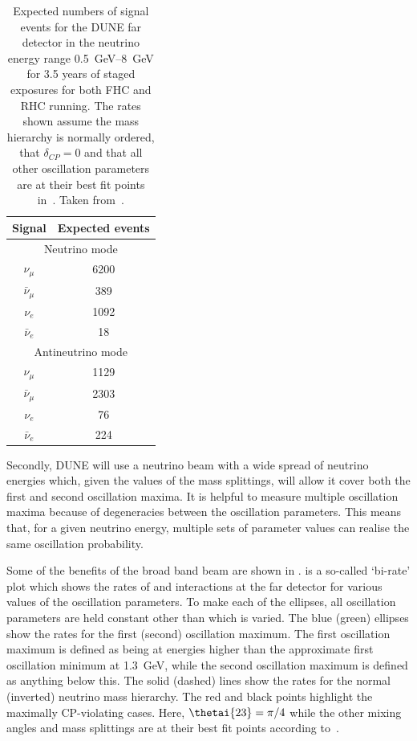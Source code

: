 \begin{table}
  \caption[Expected numbers of DUNE far detector events.]{Expected numbers of signal events for the DUNE far detector in the neutrino energy range \SIrange{0.5}{8}{\giga\electronvolt} for 3.5 years of staged exposures for both FHC and RHC running. The rates shown assume the mass hierarchy is normally ordered, that $\delta_{CP}=0$ and that all other oscillation parameters are at their best fit points in~\cite{nufit4}. Taken from~\cite{tdrVol2}.}
  \label{tab:statistics}
  \centering
  \begin{tabular}{c c}
    \hline
    Signal & Expected events \\
    \hline
    \hline
    \multicolumn{2}{c}{Neutrino mode} \\
    $\nu_{\mu}$ & 6200 \\
    $\bar{\nu}_{\mu}$ & 389 \\
    $\nu_{e}$ & 1092 \\
    $\bar{\nu}_{e}$ & 18 \\
    \hline
    \multicolumn{2}{c}{Antineutrino mode} \\
    $\nu_{\mu}$ & 1129 \\
    $\bar{\nu}_{\mu}$ & 2303 \\
    $\nu_{e}$ & 76 \\
    $\bar{\nu}_{e}$ & 224 \\
    \hline
  \end{tabular}
\end{table}

Secondly, DUNE will use a neutrino beam with a wide spread of neutrino energies which, given the values of the mass splittings, will allow it cover both the first and second oscillation maxima.
It is helpful to measure multiple oscillation maxima because of degeneracies between the oscillation parameters.
This means that, for a given neutrino energy, multiple sets of parameter values can realise the same oscillation probability.

Some of the benefits of the broad band beam are shown in .
 is a so-called `bi-rate' plot which shows the rates of \nue and \anue interactions at the far detector for various values of the oscillation parameters.
To make each of the ellipses, all oscillation parameters are held constant other than \dcp which is varied.
The blue (green) ellipses show the rates for the first (second) oscillation maximum.
The first oscillation maximum is defined as being at energies higher than the approximate first oscillation minimum at \SI{1.3}{\giga\electronvolt}, while the second oscillation maximum is defined as anything below this.
The solid (dashed) lines show the rates for the normal (inverted) neutrino mass hierarchy.
The red and black points highlight the maximally CP-violating cases.
Here, $\thetai{23}=\pi/4$ while the other mixing angles and mass splittings are at their best fit points according to~\cite{nufit4}.

